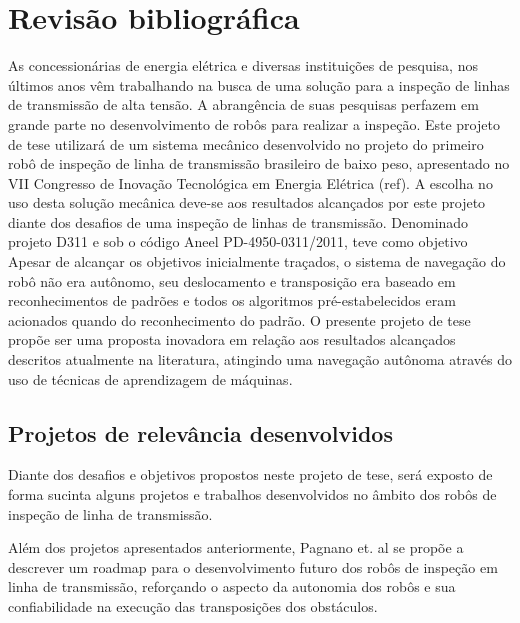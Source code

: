 \setcounter{equation}{0}
\chapter{Revisão bibliográfica}
As concessionárias de energia elétrica e diversas instituições de pesquisa, nos últimos anos vêm trabalhando na busca de uma solução para a inspeção de linhas de transmissão de alta tensão. A abrangência de suas pesquisas perfazem em grande parte no desenvolvimento de robôs para realizar a inspeção. Este projeto de tese utilizará de um sistema mecânico desenvolvido no projeto do primeiro robô de inspeção de linha de transmissão brasileiro de baixo peso, apresentado no VII Congresso de Inovação Tecnológica em Energia Elétrica (ref). A escolha no uso desta solução mecânica deve-se aos resultados alcançados por este projeto diante dos desafios de uma inspeção de linhas de transmissão. Denominado projeto D311 e sob o código Aneel PD-4950-0311/2011, teve como objetivo
Apesar de alcançar os objetivos inicialmente traçados, o sistema de navegação do robô não era autônomo, seu deslocamento e transposição era baseado em reconhecimentos de padrões e todos os algoritmos pré-estabelecidos eram acionados quando do reconhecimento do padrão.
O presente projeto de tese propõe ser uma proposta inovadora em relação aos resultados alcançados descritos atualmente na literatura, atingindo uma navegação autônoma através do uso de técnicas de aprendizagem de máquinas.

\section{Projetos de relevância desenvolvidos}
Diante dos desafios e objetivos propostos neste projeto de tese, será exposto de forma sucinta alguns projetos e trabalhos desenvolvidos no âmbito dos robôs de inspeção de linha de transmissão.

Além dos projetos apresentados anteriormente, Pagnano et. al \cite{pag:13} se propõe a descrever um roadmap para o desenvolvimento futuro dos robôs de inspeção em linha de transmissão, reforçando o aspecto da autonomia dos robôs e sua confiabilidade na execução das transposições dos obstáculos.

